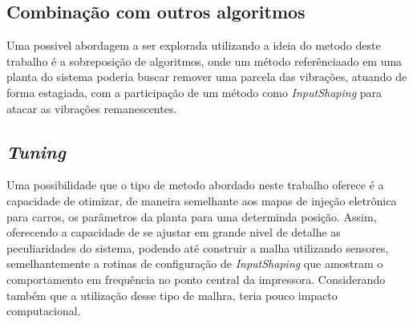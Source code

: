 \subsection{Combinação com outros algoritmos}
Uma possivel abordagem a ser explorada utilizando a ideia do metodo deste trabalho é a sobreposição de algoritmos, onde
um método referênciaado em uma planta do sistema poderia buscar remover uma parcela das vibrações, atuando de forma estagiada,
com a participação de um método como \textit{InputShaping} para atacar as vibrações remanescentes.

\subsection{\textit{Tuning}}
Uma possibilidade que o tipo de metodo abordado neste trabalho oferece é a capacidade de otimizar, de maneira
semelhante aos mapas de injeção eletrônica para carros, os parâmetros da planta para uma determinda posição.
Assim, oferecendo a capacidade de se ajustar em grande nivel de detalhe as peculiaridades do sistema, podendo até
construir a malha utilizando sensores, semelhantemente a rotinas de configuração de \textit{InputShaping} que amostram
o comportamento em frequência no ponto central da impressora. Considerando também que a utilização desse tipo de malhra,
teria pouco impacto computacional.


